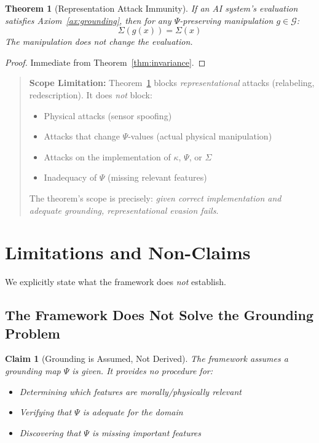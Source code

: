 \documentclass[12pt]{article}
\newtheorem{theorem}{Theorem}[section]
\newtheorem{claim}{Claim}
\theoremstyle{definition}
\theoremstyle{remark}
\newcommand{\calG}{\mathcal{G}}
\begin{document}
\begin{theorem}[Representation Attack Immunity]\label{thm:attack-immune}
If an AI system's evaluation satisfies Axiom~\ref{ax:grounding}, then for any $\Psi$-preserving manipulation $g \in \calG$:
\[
    \Sigma(g(x)) = \Sigma(x)
\]
The manipulation does not change the evaluation.
\end{theorem}

\begin{proof}
Immediate from Theorem~\ref{thm:invariance}.
\end{proof}

\begin{quote}
\textbf{Scope Limitation:} Theorem~\ref{thm:attack-immune} blocks \emph{representational} attacks (relabeling, redescription).
It does \emph{not} block:
\begin{itemize}
    \item Physical attacks (sensor spoofing)
    \item Attacks that change $\Psi$-values (actual physical manipulation)
    \item Attacks on the implementation of $\kappa$, $\Psi$, or $\Sigma$
    \item Inadequacy of $\Psi$ (missing relevant features)
\end{itemize}
The theorem's scope is precisely: \emph{given correct implementation and adequate grounding,
representational evasion fails}.
\end{quote}

\section{Limitations and Non-Claims}

We explicitly state what the framework does \emph{not} establish.

\subsection{The Framework Does Not Solve the Grounding Problem}

\begin{claim}[Grounding is Assumed, Not Derived]\label{claim:grounding-assumed}
The framework assumes a grounding map $\Psi$
is given. It provides no procedure for:
\begin{itemize}
    \item Determining which features are morally/physically relevant
    \item Verifying that $\Psi$ is adequate for the domain
    \item Discovering that $\Psi$ is missing important features
\end{itemize}
\end{claim}
\end{document}
